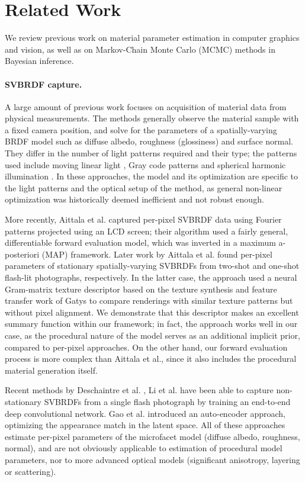 \section{Related Work}
\label{sec:prior_work}
%
We review previous work on material parameter estimation in computer graphics and vision, as well as on Markov-Chain Monte Carlo (MCMC) methods in Bayesian inference.

\paragraph*{SVBRDF capture.} A large amount of previous work focuses on acquisition of material data from physical measurements. The methods generally observe the material sample with a fixed camera position, and solve for the parameters of a spatially-varying BRDF model such as diffuse albedo, roughness (glossiness) and surface normal. They differ in the number of light patterns required and their type; the patterns used include moving linear light \cite{Gardner2003}, Gray code patterns \cite{Francken2009} and spherical harmonic illumination \cite{Ghosh2009}. In these approaches, the model and its optimization are specific to the light patterns and the optical setup of the method, as general non-linear optimization was historically deemed  inefficient and not robust enough.

More recently, Aittala et al. \cite{Aittala2013} captured per-pixel SVBRDF data using Fourier patterns projected using an LCD screen; their algorithm used a fairly general, differentiable forward evaluation model, which was inverted in a maximum a-posteriori (MAP) framework. Later work by Aittala et al. \cite{Aittala2015,Aittala2016} found per-pixel parameters of stationary spatially-varying SVBRDFs from two-shot and one-shot flash-lit photographs, respectively. In the latter case, the approach used a neural Gram-matrix texture descriptor based on the texture synthesis and feature transfer work of Gatys \cite{Gatys2015,Gatys2016} to compare renderings with similar texture patterns but without pixel alignment. We demonstrate that this descriptor makes an excellent summary function within our framework; in fact, the approach works well in our case, as the procedural nature of the model serves as an additional implicit prior, compared to per-pixel approaches. On the other hand, our forward evaluation process is more complex than Aittala et al., since it also includes the procedural material generation itself.

Recent methods by Deschaintre et al. \cite{Deschaintre2018}, Li et al. \cite{Li2018} have been able to capture non-stationary SVBRDFs from a single flash photograph by training an end-to-end deep convolutional network. Gao et al. \cite{Gao2019} introduced an auto-encoder approach, optimizing the appearance match in the latent space. All of these approaches estimate per-pixel parameters of the microfacet model (diffuse albedo, roughness, normal), and are not obviously applicable to estimation of procedural model parameters, nor to more advanced optical models (significant anisotropy, layering or scattering).

